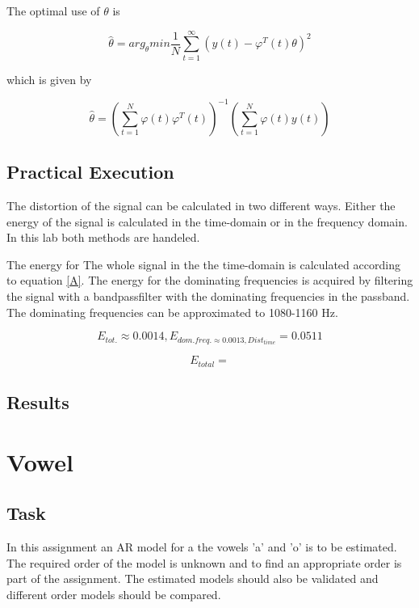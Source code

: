 \documentclass[12pt]{article}
\begin{document}
The optimal use of $\theta$ is

\begin{equation}
\hat{\theta}=arg_{\theta}min \frac{1}{N}\sum_{t=1}^{\infty}(y(t)-\varphi^T(t)\theta)^2
\end{equation}

which is given by

\begin{equation}
\hat{\theta}=\left(\sum_{t=1}^N\varphi(t)\varphi^T(t)\right)^{-1}\left(\sum_{t=1}^N\varphi(t)y(t)\right)
\end{equation}


\subsection{Practical Execution}
The distortion of the signal can be calculated in two different ways. Either the energy of the signal is calculated in the time-domain or in the frequency domain. In this lab both methods are handeled.

The energy for The whole signal in the the time-domain is calculated according to equation \ref{A}. The energy for the dominating frequencies is acquired by filtering the signal with a bandpassfilter with the dominating frequencies in the passband. The dominating frequencies can be approximated to 1080-1160 Hz. 

\begin{equation}
  E_{tot.} \approx 0.0014, E_{dom. freq.\approx 0.0013, Dist_{time}} = 0.0511
\end{equation}

\[
E_{total}=
\]


\subsection{Results}

\section{Vowel}

\subsection{Task}
In this assignment an AR model for a the vowels 'a' and 'o' is to be estimated.
The required order of the model is unknown and to find an appropriate order is part of the assignment.
The estimated models should also be validated and different order models should be compared.
\end{document}
